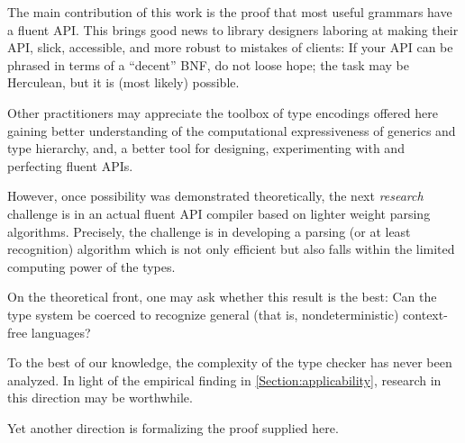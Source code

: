 The main contribution of this work is the proof that 
  most useful grammars have a fluent API.
This brings good news to library designers laboring
  at making their API, slick, accessible, and more
  robust to mistakes of clients: 
If your API can be phrased in terms of a ``decent''
  BNF, do not loose hope; the task may be Herculean, but it is (most likely) possible. 

Other practitioners may appreciate the toolbox of type encodings offered here 
  gaining better understanding of the computational expressiveness of
  \Java generics and type hierarchy, and, a better tool
  for designing, experimenting with and perfecting fluent APIs.

However, once possibility was demonstrated theoretically, the next \emph{research} 
    challenge is in an actual fluent API compiler based on lighter weight
  parsing algorithms.
Precisely, the challenge 
  is in developing a parsing (or at least recognition) 
  algorithm which is not only efficient but also falls within the limited computing power of the \Java types. 

On the theoretical front, one may ask whether 
  this result is the best:
Can the \Java type system be coerced to recognize
  general (that is, nondeterministic) context-free languages?

To the best of our knowledge, 
  the complexity of the \Java type checker has never been analyzed. 
In light of the empirical finding in \cref{Section:applicability},
  research in this direction may be worthwhile. 

Yet another direction is formalizing the proof supplied here. 




